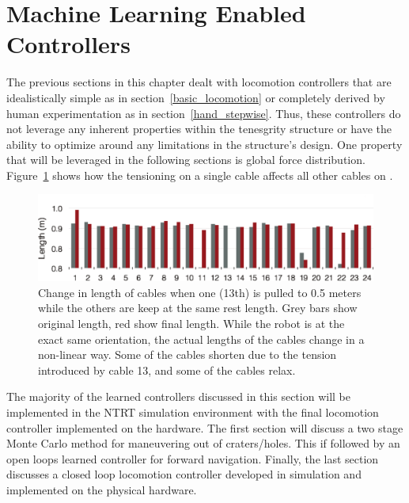 \section{Machine Learning Enabled Controllers}
\label{sec:machine_learning}
The previous sections in this chapter dealt with locomotion controllers that are idealistically simple as in section~\ref{basic_locomotion} or completely derived by human experimentation as in section~\ref{hand_stepwise}.
Thus, these controllers do not leverage any inherent properties within the tenesgrity structure or have the ability to optimize around any limitations in the structure's design.
One property that will be leveraged in the following sections is global force distribution.
Figure~\ref{fig:nonlinear} shows how the tensioning on a single cable affects all other cables on \SB{}.

\begin{figure}[thpb]
\centering
\includegraphics[width=\columnwidth]{tex/ASME-journal/results/actuate1/actuate1.eps}
\caption{ Change in length of cables when one (13th) is pulled to 0.5 meters while the others are keep at the same rest length.  Grey bars show original length, red show final length. While the robot is at the exact same orientation, the actual lengths of the cables change in a non-linear way.  Some of the cables shorten due to the tension introduced by cable 13, and some of the cables relax.}
\label{fig:nonlinear}
\end{figure}

The majority of the learned controllers discussed in this section will be implemented in the NTRT simulation environment with the final locomotion controller implemented on the \SB{} hardware.
The first section will discuss a two stage Monte Carlo method for maneuvering \SB{} out of craters/holes.
This if followed by an open loops learned controller for forward navigation.
Finally, the last section discusses a closed loop locomotion controller developed in simulation and implemented on the physical \SB{} hardware.

